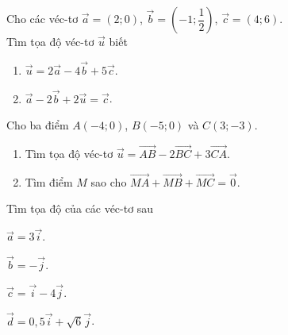 \begin{bt}%
	Cho các véc-tơ $\overrightarrow{a}=\left( 2;0 \right)$, $\overrightarrow{b}=\left( -1;\dfrac{1}{2} \right)$, $\overrightarrow{c}=\left( 4;6 \right)$.\\ 
	Tìm tọa độ véc-tơ $\overrightarrow{u}$ biết 
	\begin{enumerate}
		\item  $\overrightarrow{u}=2\overrightarrow{a}-4\overrightarrow{b}+5\overrightarrow{c}$.
		\item  $\overrightarrow{a}-2\overrightarrow{b}+2\overrightarrow{u}=\overrightarrow{c}$.
	\end{enumerate}
\end{bt}

\begin{bt}%
	Cho ba điểm $A\left( -4;0 \right)$, $B\left( -5;0 \right)$ và $C\left( 3;-3 \right)$.
	\begin{enumerate}
		\item Tìm tọa độ véc-tơ $\overrightarrow{u}=\overrightarrow{AB}-2\overrightarrow{BC}+3\overrightarrow{CA}$.
		\item Tìm điểm $M$ sao cho $\overrightarrow{MA}+\overrightarrow{MB}+\overrightarrow{MC}=\overrightarrow{0}$.
	\end{enumerate}
\end{bt}

\begin{bt}%
	Tìm tọa độ của các véc-tơ sau
	\begin{listEX}[2]
		\item $\overrightarrow{a}=3 \overrightarrow{i}$.
		\item $\overrightarrow{b}=-\overrightarrow{j}$.
		\item $\overrightarrow{c}=\overrightarrow{i}-4 \overrightarrow{j}$.
		\item $\overrightarrow{d}=0{,}5 \overrightarrow{i}+\sqrt{6} \overrightarrow{j}$.
	\end{listEX}
\end{bt}

